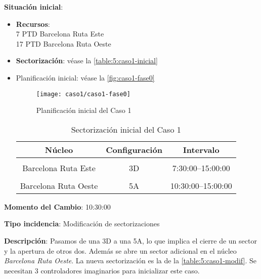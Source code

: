 \textbf{Situación inicial}:
\begin{itemize}[label={}]
		
	\item \textbf{Recursos}: \\
	7 PTD Barcelona Ruta Este \\
	17 PTD Barcelona Ruta Oeste
	
	
	\item \textbf{Sectorización}: véase la \autoref{table:5:caso1-inicial}
	
	\item Planificación inicial: véase la \autoref{fig:caso1-fase0}
	
	\begin{figure}[h]
		\centering
		\texttt{[image: caso1/caso1-fase0]}
		\caption{Planificación inicial del Caso 1}
		\label{fig:caso1-fase0}
	\end{figure}
	
	\begin{table}[h]
		\centering
		\caption{Sectorización inicial del Caso 1}
		\begin{tabular}{ccc}
			\hline
			\textbf{Núcleo}      & \textbf{Configuración} & \textbf{Intervalo}   \\ \hline
			\multicolumn{1}{l}{} & \multicolumn{1}{l}{}   & \multicolumn{1}{l}{} \\
			Barcelona Ruta Este  & 3D                     & 7:30:00--15:00:00    \\
			\multicolumn{1}{l}{} & \multicolumn{1}{l}{}   & \multicolumn{1}{l}{} \\
			Barcelona Ruta Oeste & 5A                     & 10:30:00--15:00:00   \\ \hline
		\end{tabular}
		\label{table:5:caso1-inicial}
	\end{table}
	
\end{itemize}

\textbf{Momento del Cambio}: 10:30:00

\textbf{Tipo incidencia}: Modificación de sectorizaciones

\textbf{Descripción}: Pasamos de una 3D a una 5A, lo que implica el cierre de un sector y la apertura de otros dos. Además se abre un sector adicional en el núcleo \textit{Barcelona Ruta Oeste}. La nueva sectorización es la de la \autoref{table:5:caso1-modif}. Se necesitan 3 controladores imaginarios para inicializar este caso.

